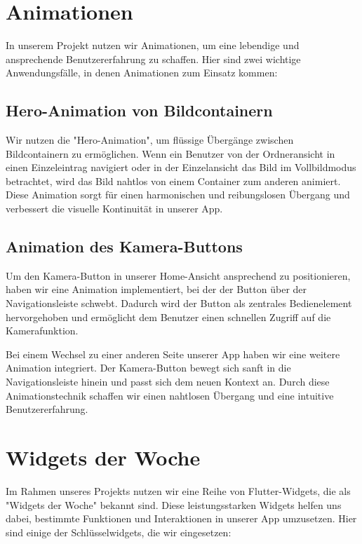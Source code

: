 \section{Animationen}
In unserem Projekt nutzen wir Animationen, um eine lebendige und ansprechende Benutzererfahrung zu schaffen. 
Hier sind zwei wichtige Anwendungsfälle, in denen Animationen zum Einsatz kommen:

\subsection{Hero-Animation von Bildcontainern}
Wir nutzen die "Hero-Animation", um flüssige Übergänge zwischen Bildcontainern zu ermöglichen. 
Wenn ein Benutzer von der Ordneransicht in einen Einzeleintrag navigiert oder in der Einzelansicht das Bild im Vollbildmodus betrachtet, 
wird das Bild nahtlos von einem Container zum anderen animiert. 
Diese Animation sorgt für einen harmonischen und reibungslosen Übergang und verbessert die visuelle Kontinuität in unserer App.

\subsection{Animation des Kamera-Buttons}
Um den Kamera-Button in unserer Home-Ansicht ansprechend zu positionieren, haben wir eine Animation implementiert, 
bei der der Button über der Navigationsleiste schwebt. Dadurch wird der Button als zentrales Bedienelement hervorgehoben und ermöglicht 
dem Benutzer einen schnellen Zugriff auf die Kamerafunktion.

Bei einem Wechsel zu einer anderen Seite unserer App haben wir eine weitere Animation integriert. 
Der Kamera-Button bewegt sich sanft in die Navigationsleiste hinein und passt sich dem neuen Kontext an. 
Durch diese Animationstechnik schaffen wir einen nahtlosen Übergang und eine intuitive Benutzererfahrung.

\section{Widgets der Woche}
Im Rahmen unseres Projekts nutzen wir eine Reihe von Flutter-Widgets, die als "Widgets der Woche" bekannt sind. 
Diese leistungsstarken Widgets helfen uns dabei, bestimmte Funktionen und Interaktionen in unserer App umzusetzen. 
Hier sind einige der Schlüsselwidgets, die wir eingesetzen:

